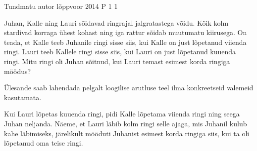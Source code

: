 {Tundmatu autor} %
{lõppvoor} %
{2014} %
{P 1} %
{1} %
{
\ifStatement
Juhan, Kalle ning Lauri sõidavad ringrajal jalgratastega võidu. Kõik kolm stardivad korraga ühest kohast ning iga rattur sõidab muutumatu kiirusega. On teada, et Kalle teeb Juhanile ringi sisse siis, kui Kalle on just lõpetanud viienda ringi. Lauri teeb Kallele ringi sisse siis, kui Lauri on just lõpetanud kuuenda ringi. Mitu ringi oli Juhan sõitnud, kui Lauri temast esimest korda ringiga möödus?
\fi

\ifHint
Ülesande saab lahendada pelgalt loogilise arutluse teel ilma konkreetseid valemeid kasutamata.
\fi

\ifSolution
Kui Lauri lõpetas kuuenda ringi, pidi Kalle lõpetama viienda ringi ning seega Juhan neljanda. Näeme, et Lauri läbib kolm ringi selle ajaga, mis Juhanil kulub kahe läbimiseks, järelikult mööduti Juhanist esimest korda ringiga siis, kui ta oli lõpetanud oma teise ringi.
\fi
}

